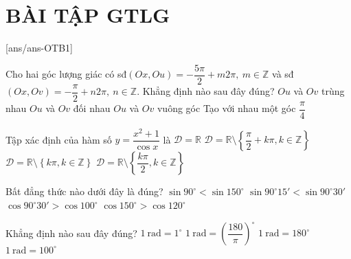 ﻿\section*{BÀI TẬP GTLG}
\setcounter{ex}{0}\setcounter{bt}{0}
[ans/ans-OTB1]
\begin{ex}%
Cho hai góc lượng giác có sđ$(Ox,Ou)=-\dfrac{5\pi }{2}+m2\pi,~m\in \mathbb{Z}$ và sđ$(Ox,Ov)=-\dfrac{\pi }{2}+n2\pi,~n\in \mathbb{Z}$. Khẳng định nào sau đây đúng?
\choice
{\True $Ou$ và $Ov$ trùng nhau}
{$Ou$ và $Ov$ đối nhau}
{$Ou$ và $Ov$ vuông góc}
{Tạo với nhau một góc $\dfrac{\pi }{4}$}
\end{ex}

\begin{ex}%
Tập xác định của hàm số $y=\dfrac{x^2+1}{\cos x}$ là
\choice
{$\mathscr{D}=\mathbb{R}$}
{\True $\mathscr{D}=\mathbb{R}\setminus\left\{\dfrac{\pi}{2}+k\pi ,k\in\mathbb{Z}\right\}$}
{\True $\mathscr{D}=\mathbb{R}\setminus\left\{ k\pi ,k\in\mathbb{Z}\right\}$}
{$\mathscr{D}=\mathbb{R}\setminus\left\{\dfrac{k\pi}{2},k\in\mathbb{Z}\right\}$}
\end{ex}

\begin{ex}%
Bất đẳng thức nào dưới đây là đúng?
\choice
{$\sin 90^\circ <\sin 150^\circ $}
{$\sin 90^\circ 15'<\sin 90^\circ 30'$}
{\True $\cos 90^\circ 30'>\cos 100^\circ $}
{$\cos 150^\circ >\cos 120^\circ $}
\end{ex}

\begin{ex}%
Khẳng định nào sau đây đúng?
\choice
{$1 ~\mathrm{rad}=1^\circ$}
{\True $1~\mathrm{rad}=\left(\dfrac{180}{\pi }\right)^\circ $}
{$1~\mathrm{rad}=180^\circ$}
{$1~\mathrm{rad}=100^\circ$}
\end{ex}

